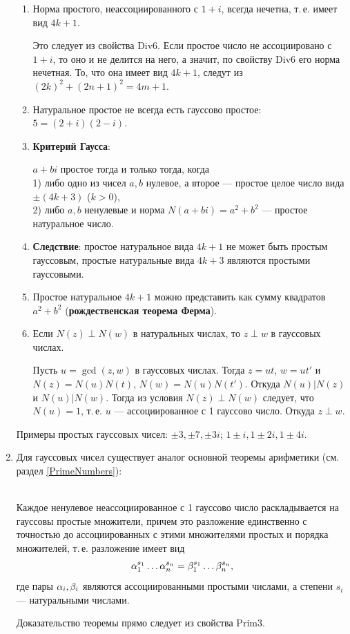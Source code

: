 \begin{enumerate}
\begin{enumerate}
\item Норма простого, неассоциированного с $1+i$, всегда нечетна, т.\,е. имеет вид $4k+1$.

Это следует из свойства Div6. Если простое число не ассоциировано с $1+i$, то оно и не делится на него, а значит, по свойству Div6 его норма нечетная. То, что она имеет вид $4k+1$, следут из $(2k)^2+(2n+1)^2=4m+1$.
\item Натуральное простое не всегда есть гауссово простое: $5=(2+i)(2-i)$.
\item \textbf{Критерий Гаусса}:
\begin{thrm}
$a+bi$ простое тогда и только тогда, когда\\
\textup{1)} либо одно из чисел $a,b$ нулевое, а второе --- простое целое число вида $\pm(4k+3)$ ($k>0$), \\
\textup{2)} либо $a,b$ ненулевые и норма $N(a+bi)=a^2+b^2$ --- простое натуральное число.
\end{thrm}
\item \textbf{Следствие}: простое натуральное вида $4k+1$ не может быть простым гауссовым, простые натуральные вида $4k+3$ являются простыми гауссовыми.
\item Простое натуральное $4k+1$ можно представить как сумму квадратов $a^2+b^2$ (\textbf{рождественская теорема Ферма}).
\item Если $N(z)\perp N(w)$ в натуральных числах, то $z\perp w$ в гауссовых числах.

Пусть $u=\gcd(z,w)$ в гауссовых числах. Тогда $z=ut$, $w=ut'$ и $N(z)=N(u)N(t)$, $N(w)=N(u)N(t')$. Откуда $N(u)|N(z)$ и $N(u)|N(w)$. Тогда из условия $N(z)\perp N(w)$ следует, что $N(u)=1$, т.\,е. $u$ --- ассоциированное с 1 гауссово число. Откуда $z\perp w$.
\end{enumerate}
Примеры простых гауссовых чисел: $\pm 3, \pm 7, \pm 3i$; $1\pm i, 1\pm 2i, 1\pm 4i$.

\item Для гауссовых чисел существует аналог основной теоремы арифметики (см. раздел \ref{PrimeNumbers}):
\begin{thrm}\label{OTAG}\quad\\
Каждое ненулевое неассоциированное с 1 гауссово число раскладывается на гауссовы простые множители, причем это разложение единственно с точностью до ассоциированных с этими множителями простых и порядка множителей, т.\,е. разложение имеет вид
$$
\alpha_1^{s_1}\dots \alpha_n^{s_n}=\beta_1^{s_1}\dots \beta_n^{s_n},
$$
где пары $\alpha_i,\beta_i$ являются ассоциированными простыми числами, а степени $s_i$ --- натуральными числами.
\end{thrm}
Доказательство теоремы прямо следует из свойства Prim3.


\end{enumerate}
